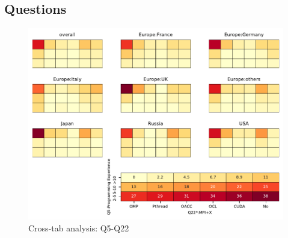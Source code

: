
\subsection{Questions}


\begin{figure}
\begin{center}
\includegraphics[width=12cm]{../pdfs/Q5-Q22.pdf}
\caption{Cross-tab analysis: Q5-Q22}
\label{fig:Q5-Q22}
\end{center}
\end{figure}
